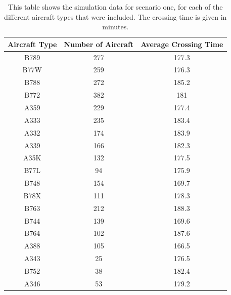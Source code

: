 \documentclass[stu, a4paper, 12pt, floatsintext]{apa7}
\numberwithin{figure}{section}
\numberwithin{table}{section}
\numberwithin{equation}{section}
\begin{document}
\begin{table}[H]
    \centering
    \caption{This table shows the simulation data for scenario one, for each of the different aircraft types that were included. The crossing time is given in minutes.}
    \label{tab:31}
    \begin{tabular}{@{}ccc@{}}
    \toprule
    \textbf{Aircraft Type} & \textbf{Number of Aircraft} & \textbf{Average Crossing Time} \\ \midrule
    B789                   & 277                         & 177.3                          \\
    B77W                   & 259                         & 176.3                          \\
    B788                   & 272                         & 185.2                          \\
    B772                   & 382                         & 181                            \\
    A359                   & 229                         & 177.4                          \\
    A333                   & 235                         & 183.4                          \\
    A332                   & 174                         & 183.9                          \\
    A339                   & 166                         & 182.3                          \\
    A35K                   & 132                         & 177.5                          \\
    B77L                   & 94                          & 175.9                          \\
    B748                   & 154                         & 169.7                          \\
    B78X                   & 111                         & 178.3                          \\
    B763                   & 212                         & 188.3                          \\
    B744                   & 139                         & 169.6                          \\
    B764                   & 102                         & 187.6                          \\
    A388                   & 105                         & 166.5                          \\
    A343                   & 25                          & 176.5                          \\
    B752                   & 38                          & 182.4                          \\
    A346                   & 53                          & 179.2                          \\ \bottomrule
    \end{tabular}
\end{table}
\end{document}
